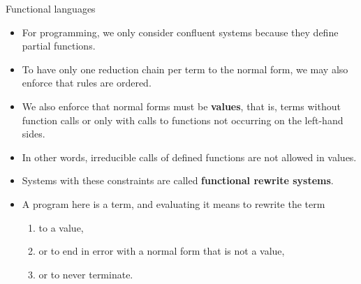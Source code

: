 \documentclass[compress,dvipdfmx]{beamer}
\begin{document}
%
\begin{frame}{Functional languages}

  \begin{itemize}

    \item For programming, we only consider confluent systems because
      they define partial functions.

    \item To have only one reduction chain per term to the normal
      form, we may also enforce that rules are ordered.

    \item We also enforce that normal forms must be \textbf{values},
      that is, terms without function calls or only with calls to
      functions not occurring on the left\hyp{}hand sides.

    \item In other words, irreducible calls of defined functions are
      not allowed in values.

    \item Systems with these constraints are called \textbf{functional
      rewrite systems}.

    \item A program here is a term, and evaluating it means to rewrite
      the term
      \begin{enumerate}
        \item to a value,
        \item or to end in error with a normal form that is not a value,
        \item or to never terminate.
      \end{enumerate}

  \end{itemize}

\end{frame}
\end{document}
